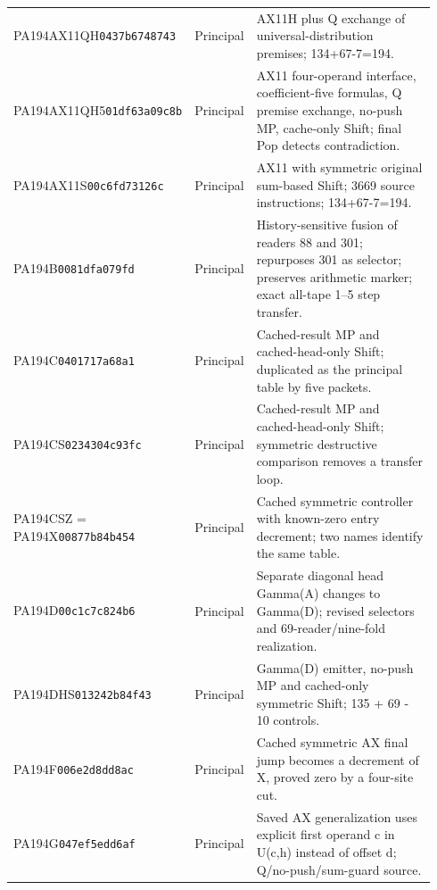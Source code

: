 {\begin{longtable}{@{}p{0.23\linewidth}p{0.13\linewidth}p{0.58\linewidth}@{}}
PA194AX11QH\newline\texttt{0437b6748743} & Principal & AX11H plus Q exchange of universal-distribution premises; 134+67-7=194.\\[2.5pt]
PA194AX11QH5\newline\texttt{01df63a09c8b} & Principal & AX11 four-operand interface, coefficient-five formulas, Q premise exchange, no-push MP, cache-only Shift; final Pop detects contradiction.\\[2.5pt]
PA194AX11S\newline\texttt{00c6fd73126c} & Principal & AX11 with symmetric original sum-based Shift; 3669 source instructions; 134+67-7=194.\\[2.5pt]
PA194B\newline\texttt{0081dfa079fd} & Principal & History-sensitive fusion of readers 88 and 301; repurposes 301 as selector; preserves arithmetic marker; exact all-tape 1--5 step transfer.\\[2.5pt]
PA194C\newline\texttt{0401717a68a1} & Principal & Cached-result MP and cached-head-only Shift; duplicated as the principal table by five packets.\\[2.5pt]
PA194CS\newline\texttt{0234304c93fc} & Principal & Cached-result MP and cached-head-only Shift; symmetric destructive comparison removes a transfer loop.\\[2.5pt]
PA194CSZ = PA194X\newline\texttt{00877b84b454} & Principal & Cached symmetric controller with known-zero entry decrement; two names identify the same table.\\[2.5pt]
PA194D\newline\texttt{00c1c7c824b6} & Principal & Separate diagonal head Gamma(A) changes to Gamma(D); revised selectors and 69-reader/nine-fold realization.\\[2.5pt]
PA194DHS\newline\texttt{013242b84f43} & Principal & Gamma(D) emitter, no-push MP and cached-only symmetric Shift; 135 + 69 - 10 controls.\\[2.5pt]
PA194F\newline\texttt{006e2d8dd8ac} & Principal & Cached symmetric AX final jump becomes a decrement of X, proved zero by a four-site cut.\\[2.5pt]
PA194G\newline\texttt{047ef5edd6af} & Principal & Saved AX generalization uses explicit first operand c in U(c,h) instead of offset d; Q/no-push/sum-guard source.\\[2.5pt]

\end{longtable}}
